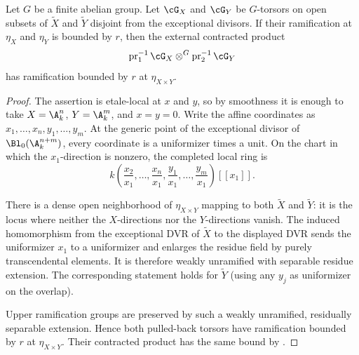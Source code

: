 \begin{prop}\label{prop:ramification-external-product}
Let $G$ be a finite abelian group. Let $\cG_X$ and $\cG_Y$ be $G$-torsors on
open subsets of $\widetilde X$ and $\widetilde Y$ disjoint from the exceptional
divisors. If their ramification at $\eta_X$ and $\eta_Y$ is bounded by $r$,
then the external contracted product
\[
    \operatorname{pr}_1^{-1}\cG_X
       \otimes^G
    \operatorname{pr}_2^{-1}\cG_Y
\]
has ramification bounded by $r$ at $\eta_{X\times Y}$.
\end{prop}
\begin{proof}
The assertion is etale-local at $x$ and $y$, so by smoothness it is enough to
take $X=\A_k^n$, $Y=\A_k^m$, and $x=y=0$. Write the affine coordinates as
$x_1,\dots,x_n,y_1,\dots,y_m$. At the generic point of the exceptional divisor
of $\Bl_0(\A_k^{n+m})$, every coordinate is a uniformizer times a unit. On the
chart in which the $x_1$-direction is nonzero, the completed local ring is
\[
 k\left(\frac{x_2}{x_1},\dots,\frac{x_n}{x_1},
          \frac{y_1}{x_1},\dots,
          \frac{y_m}{x_1}\right)[[x_1]].
\]

There is a dense open neighborhood of $\eta_{X\times Y}$ mapping to both
$\widetilde X$ and $\widetilde Y$: it is the locus where neither the
$X$-directions nor the $Y$-directions vanish. The induced homomorphism from the
exceptional DVR of $\widetilde X$ to the displayed DVR sends the uniformizer
$x_1$ to a uniformizer and enlarges the residue field by purely transcendental
elements. It is therefore weakly unramified with separable residue extension.
The corresponding statement holds for $\widetilde Y$ (using any $y_j$ as
uniformizer on the overlap).

Upper ramification groups are preserved by such a weakly unramified,
residually separable extension. Hence both pulled-back torsors have
ramification bounded by $r$ at $\eta_{X\times Y}$. Their contracted product
has the same bound by
.
\end{proof}
